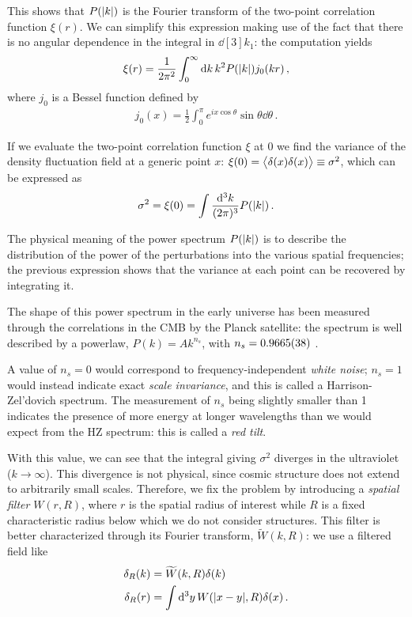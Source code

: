 \documentclass[main.tex]{subfiles}
\begin{document}
This shows that \(P(\abs{k})\) is the Fourier transform of the two-point correlation function \(\xi (r)\). 
We can simplify this expression making use of the fact that there is no angular dependence in the integral in \(\dd[3]{k_1}\): 
the computation yields 
%
\begin{align}
\xi (r) = \frac{1}{2 \pi^2} \int_0^{\infty } \dd{k} k^2 P(\abs{k}) j_0 (kr)
\,,
\end{align}
%
where \(j_0 \) is a Bessel function defined by 
%
\begin{align}
j_0 (x) =  \frac{1}{2} \int_0^{\pi } e^{i x \cos \theta } \sin \theta \dd{\theta } 
\,.
\end{align}


If we evaluate the two-point correlation function \(\xi \) at 0 we find the variance of the density fluctuation field at a generic point \(x\): \(\xi (0) = \expval{ \delta (x) \delta (x)} \equiv \sigma^2\), which can be expressed as 
%
\begin{align}
\sigma^2 = \xi (0) = \int \frac{ \dd[3]{k}}{(2 \pi )^3} P(\abs{k})
\,.
\end{align}
%

The physical meaning of the power spectrum \(P(\abs{k})\) is to describe the distribution of the power of the perturbations into the various spatial frequencies; the previous expression shows that the variance at each point can be recovered by integrating it. 

The shape of this power spectrum in the early universe has been measured through the correlations in the CMB by the Planck satellite: the spectrum is well described by a powerlaw, \(P(k) = A k^{n_s}\), with \(n_s = \num{0.9665 +- 0.0038}\) \cite[eq.\ 38]{planckcollaborationPlanck2018Results2019}.

A value of \(n_s = 0\) would correspond to frequency-independent \emph{white noise}; \(n_s = 1\) would instead indicate exact \emph{scale invariance}, and this is called a Harrison-Zel'dovich spectrum.
The measurement of \(n_s\) being slightly smaller than 1 indicates the presence of more energy at longer wavelengths than we would expect from the HZ spectrum: this is called a \emph{red tilt}. 

With this value, we can see that the integral giving \(\sigma^2\) diverges in the ultraviolet (\(k \to \infty\)). 
This divergence is not physical, since cosmic structure does not extend to arbitrarily small scales. Therefore, we fix the problem by introducing a \emph{spatial filter} \(W(r, R)\), where \(r\) is the spatial radius of interest while \(R\) is a fixed characteristic radius below which we do not consider structures. This filter is better characterized through its Fourier transform, \(\widetilde{W}(k, R)\): we use a filtered field like 
%
\begin{align}
\delta_R (k) &= \widetilde{W}(k, R) \delta (k)  \\
\delta _R(r) &= \int \dd[3]{y} W(\abs{x-y}, R) \delta (x)
\,.
\end{align}
\end{document}

